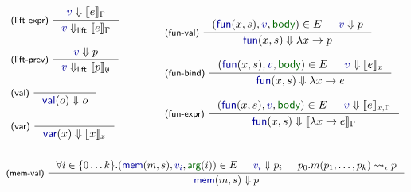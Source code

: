 \documentclass[english,crc,references=cleveref]{programming}
\theoremstyle{plain}
\theoremstyle{definition}
\newcommand{\ident}[1]{\textnormal{\textcolor{idclr}{\sffamily #1}}}
\newcommand{\bndclr}[1]{\textcolor{kvdclr}{#1}}
\newcommand{\bnd}[1]{\textnormal{\textcolor{kvdclr}{\sffamily #1}}}
\newcommand{\blbl}[1]{\textnormal{\textcolor{numclr}{\sffamily #1}}}
\newcommand{\rname}[1]{{\sffamily(#1)}}
\begin{document}

\begin{figure}
\begin{equation*}
%
\hspace{-0.5em}
\begin{array}{l}
\inference[\rname{lift-expr}~]
  {\bndclr{v} \Downarrow \llbracket e \rrbracket_\Gamma}
  {\bndclr{v} \Downarrow_{\ident{lift}} \llbracket e \rrbracket_\Gamma}
\\
\\
\inference[\rname{lift-prev}~]
  {\bndclr{v} \Downarrow p}
  {\bndclr{v} \Downarrow_{\ident{lift}} \llbracket p \rrbracket_\emptyset}
\\
\\
\inference[\rname{val}~]
  {~}
  {\bnd{val}(o) \Downarrow o }
\\
\\
\inference[\rname{var}~]
  {~}
  {\bnd{var}(x) \Downarrow \llbracket x \rrbracket_x}
  \\[0.5em]~
\end{array}
\qquad\quad
\begin{array}{l}
\inference[\rname{fun-val}~]
  { (\bnd{fun}(x, s), \bndclr{v}, \blbl{body}) \in E & \bndclr{v} \Downarrow p }
  { \bnd{fun}(x, s) \Downarrow \lambda x\rightarrow p }
\\
\\
\inference[\rname{fun-bind}~]
  { (\bnd{fun}(x, s), \bndclr{v}, \blbl{body}) \in E & \bndclr{v} \Downarrow \llbracket e \rrbracket_{x} }
  { \bnd{fun}(x, s) \Downarrow \lambda x\rightarrow e }
\\
\\
\inference[\rname{fun-expr}~]
  { (\bnd{fun}(x, s), \bndclr{v}, \blbl{body}) \in E & \bndclr{v} \Downarrow \llbracket e \rrbracket_{x,\Gamma} }
  { \bnd{fun}(x, s) \Downarrow \llbracket \lambda x\rightarrow e \rrbracket_\Gamma }
\\[0.5em]~
\end{array}
\end{equation*}
%
\begin{equation*}
\hspace{-1em}
\begin{array}{l}
\inference[\rname{mem-val}~]
  { \forall i\in\{0\ldots k\}.(\bnd{mem}(m, s), \bndclr{v_i}, \blbl{arg}(i)) \in E & \bndclr{v_i} \Downarrow p_i
    & p_0.m(p_1, \ldots, p_k) \rightsquigarrow_\epsilon p }
  { \bnd{mem}(m, s) \Downarrow p }
\\

\end{array}
\end{equation*}
\end{figure}
\end{document}

